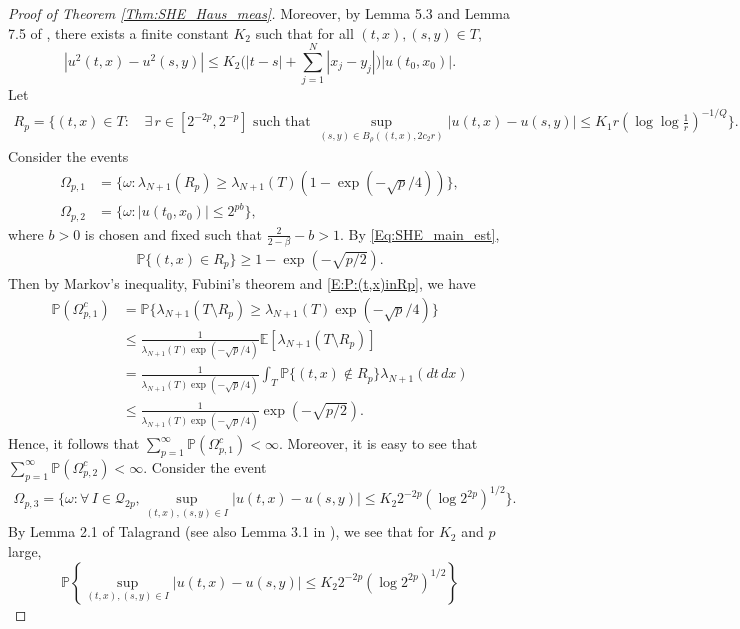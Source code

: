 \documentclass[11pt, reqno]{amsart}
\def\E{{\mathbb E}}
\def\P{{\mathbb P}}
\numberwithin{equation}{section}
\begin{document}
\begin{proof}[Proof of Theorem \ref{Thm:SHE_Haus_meas}]
Moreover, by Lemma 5.3 and Lemma 7.5 of \cite{DMX17}, there exists a finite constant $K_2$ such that for all $(t, x), (s, y) \in T$, 
\begin{equation}\label{Eq:SHE_lemma4}
|u^2(t, x) - u^2(s, y)| \le K_2 \big(|t-s| + \sum_{j=1}^N|x_j-y_j|\big) |u(t_0, x_0)|.
\end{equation}
Let 
\begin{align*}
R_p = \Bigg\{ (t, x) \in T : \,&\exists\, r \in [2^{-2p}, 2^{-p}] \text{ such that }
\sup_{(s, y) \in B_\rho((t, x), 2c_2r)} |u(t, x) - u(s, y)| \le K_1r \left( \log\log\frac{1}{r}\right)^{-1/Q} \Bigg\}.
\end{align*}
Consider the events
\begin{align*}
\Omega_{p, 1} &= \Big\{ \omega : \lambda_{N+1}(R_p) \ge \lambda_{N+1}(T) (1 - \exp(-\sqrt{p}/4)) \Big\},\\
\Omega_{p, 2} &= \Big\{ \omega : |u(t_0, x_0)| \le 2^{pb} \Big\},
\end{align*}
where $b > 0$ is chosen and fixed such that $\frac{2}{2-\beta} - b > 1$.
By \eqref{Eq:SHE_main_est}, 
\begin{align}\label{E:P:(t,x)inRp}
\P\{(t, x) \in R_p\} \ge 1 - \exp(-\sqrt{p/2}).
\end{align}
Then by Markov's inequality, Fubini's theorem and \eqref{E:P:(t,x)inRp}, we have
\begin{align*}
\P(\Omega_{p,1}^c) &= \P\{ \lambda_{N+1}(T\setminus R_p) \ge \lambda_{N+1}(T) \exp(-\sqrt{p}/4) \}\\
&\le \frac{1}{\lambda_{N+1}(T) \exp(-\sqrt{p}/4)} \E[\lambda_{N+1}(T\setminus R_p)]\\
&= \frac{1}{\lambda_{N+1}(T) \exp(-\sqrt{p}/4)} \int_T \P\{(t,x) \not\in R_p\} \lambda_{N+1}(dt\,dx) \\
&\le \frac{1}{\lambda_{N+1}(T) \exp(-\sqrt{p}/4)} \exp(-\sqrt{p/2}).
\end{align*}
Hence, it follows that $\sum_{p=1}^\infty \P(\Omega_{p,1}^c) < \infty$.
Moreover, it is easy to see that $\sum_{p=1}^\infty \P(\Omega_{p,2}^c) < \infty$.
Consider the event
\begin{align*}
\Omega_{p, 3} = \bigg\{ \omega : \forall \, I \in \mathscr{Q}_{2p}, \sup_{(t, x), (s, y) \in I} |u(t, x) - u(s, y)|
 \le K_2 2^{-2p} (\log 2^{2p})^{1/2} \bigg\}.
\end{align*}
By Lemma 2.1 of Talagrand \cite{T95} (see also Lemma 3.1 in \cite{DMX17}), we see that for $K_2$ and $p$ large, 
\[ \P\left\{\sup_{(t, x), (s, y) \in I} |u(t, x) - u(s, y)| \le K_2 2^{-2p} (\log 2^{2p})^{1/2} \right\}
\]
\end{proof}
\end{document}
